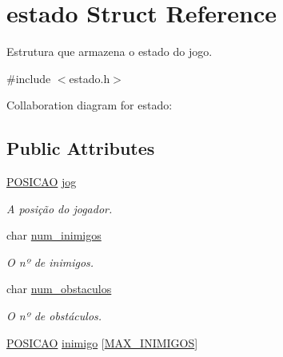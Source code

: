 \hypertarget{structestado}{}\section{estado Struct Reference}
\label{structestado}


Estrutura que armazena o estado do jogo.  




{\ttfamily \#include $<$estado.\+h$>$}



Collaboration diagram for estado\+:
\subsection*{Public Attributes}
\begin{DoxyCompactItemize}
\item 
\hyperlink{estado_8h_a55b3f4b56938eeb8fa5e8f9c07baf1b0}{P\+O\+S\+I\+C\+AO} \hyperlink{structestado_abf55d0d40aafdd6829efbc8265b4f724}{jog}\hypertarget{structestado_abf55d0d40aafdd6829efbc8265b4f724}{}\label{structestado_abf55d0d40aafdd6829efbc8265b4f724}

\begin{DoxyCompactList}\small\item\em A posição do jogador. \end{DoxyCompactList}\item 
char \hyperlink{structestado_a6fbc4a80c4f371036f264ecfe27e5f9e}{num\+\_\+inimigos}\hypertarget{structestado_a6fbc4a80c4f371036f264ecfe27e5f9e}{}\label{structestado_a6fbc4a80c4f371036f264ecfe27e5f9e}

\begin{DoxyCompactList}\small\item\em O nº de inimigos. \end{DoxyCompactList}\item 
char \hyperlink{structestado_ac1a8a541e2301189833c6f713c416063}{num\+\_\+obstaculos}\hypertarget{structestado_ac1a8a541e2301189833c6f713c416063}{}\label{structestado_ac1a8a541e2301189833c6f713c416063}

\begin{DoxyCompactList}\small\item\em O nº de obstáculos. \end{DoxyCompactList}\item 
\hyperlink{estado_8h_a55b3f4b56938eeb8fa5e8f9c07baf1b0}{P\+O\+S\+I\+C\+AO} \hyperlink{structestado_a8f7d47deb337ae082beab6a574ace9e3}{inimigo} \mbox{[}\hyperlink{estado_8h_aa97e6cbfdd94711688f1176cb8dd916a}{M\+A\+X\+\_\+\+I\+N\+I\+M\+I\+G\+OS}\mbox{]}\hypertarget{structestado_a8f7d47deb337ae082beab6a574ace9e3}{}\label{structestado_a8f7d47deb337ae082beab6a574ace9e3}


\end{DoxyCompactItemize}

